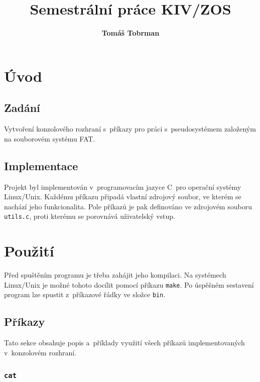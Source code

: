 \documentclass[12pt]{article}
\author{\textbf{Tomáš Tobrman}}
\title{Semestrální práce \textbf{KIV/ZOS}}
\date{}
\begin{document}
\maketitle
\thispagestyle{empty}
\newpage

\tableofcontents
\thispagestyle{empty}
\newpage

\setcounter{page}{1}

\section{Úvod}

\subsection{Zadání}

Vytvoření konzolového rozhraní s~příkazy pro práci s~pseudosystémem založeným na souborovém systému FAT.

\subsection{Implementace}

Projekt byl implementován v~programovacím jazyce C~pro operační systémy Linux/Unix.
Každému příkazu připadá vlastní zdrojový soubor, ve kterém se nachází jeho funkcionalita.
Pole příkazů je pak definováno ve zdrojovém souboru \texttt{utils.c}, proti kterému se porovnává uživatelský vstup.

\section{Použití}\label{sec:usage}

Před spuštěním programu je třeba zahájit jeho kompilaci.
Na systémech Linux/Unix je možné tohoto docílit pomocí příkazu \texttt{make}.
Po úspěšném sestavení program lze spustit z~příkazové řádky ve složce \texttt{bin}.

\subsection{Příkazy}\label{sec:commands}

Tato sekce obsahuje popis a~příklady využití všech příkazů implementovaných v~konzolovém rozhraní.

\subsubsection{\texttt{cat}}\label{sec:cat}
\end{document}
